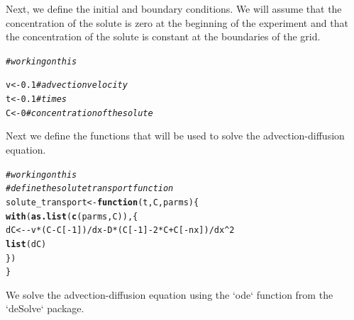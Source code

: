 \documentclass{tufte-handout}\usepackage[]{graphicx}\usepackage[]{xcolor}
\makeatletter
\newcommand{\hlnum}[1]{\textcolor[rgb]{0.686,0.059,0.569}{#1}}%
\newcommand{\hlcom}[1]{\textcolor[rgb]{0.678,0.584,0.686}{\textit{#1}}}%
\newcommand{\hlopt}[1]{\textcolor[rgb]{0,0,0}{#1}}%
\newcommand{\hlstd}[1]{\textcolor[rgb]{0.345,0.345,0.345}{#1}}%
\newcommand{\hlkwa}[1]{\textcolor[rgb]{0.161,0.373,0.58}{\textbf{#1}}}%
\newcommand{\hlkwb}[1]{\textcolor[rgb]{0.69,0.353,0.396}{#1}}%
\newcommand{\hlkwc}[1]{\textcolor[rgb]{0.333,0.667,0.333}{#1}}%
\newcommand{\hlkwd}[1]{\textcolor[rgb]{0.737,0.353,0.396}{\textbf{#1}}}%
\newenvironment{kframe}{%
 \def\at@end@of@kframe{}%
 \ifinner\ifhmode%
  \def\at@end@of@kframe{\end{minipage}}%
  \begin{minipage}{\columnwidth}%
 \fi\fi%
 \def\FrameCommand##1{\hskip\@totalleftmargin \hskip-\fboxsep
 \colorbox{shadecolor}{##1}\hskip-\fboxsep
     \hskip-\linewidth \hskip-\@totalleftmargin \hskip\columnwidth}%
 \MakeFramed {\advance\hsize-\width
   \@totalleftmargin\z@ \linewidth\hsize
   \@setminipage}}%
 {\par\unskip\endMakeFramed%
 \at@end@of@kframe}
\newenvironment{knitrout}{}{} %
\makeatother
\begin{document}
Next, we define the initial and boundary conditions. We will assume that the concentration of the solute is zero at the beginning of the experiment and that the concentration of the solute is constant at the boundaries of the grid.

\begin{knitrout}
\color{fgcolor}\begin{kframe}
\begin{alltt}
\hlcom{# working on this}

\hlstd{v} \hlkwb{<-} \hlnum{0.1} \hlcom{# advection velocity}
\hlstd{t} \hlkwb{<-} \hlnum{0.1} \hlcom{# times}
\hlstd{C} \hlkwb{<-} \hlnum{0} \hlcom{# concentration of the solute}
\end{alltt}
\end{kframe}
\end{knitrout}

Next we define the functions that will be used to solve the advection-diffusion equation.

\begin{knitrout}
\color{fgcolor}\begin{kframe}
\begin{alltt}
\hlcom{# working on this}
\hlcom{# define the solute transport function}
\hlstd{solute_transport} \hlkwb{<-} \hlkwa{function}\hlstd{(}\hlkwc{t}\hlstd{,} \hlkwc{C}\hlstd{,} \hlkwc{parms}\hlstd{) \{}
  \hlkwd{with}\hlstd{(}\hlkwd{as.list}\hlstd{(}\hlkwd{c}\hlstd{(parms, C)), \{}
    \hlstd{dC} \hlkwb{<-} \hlopt{-}\hlstd{v} \hlopt{*} \hlstd{(C} \hlopt{-} \hlstd{C[}\hlopt{-}\hlnum{1}\hlstd{])}\hlopt{/}\hlstd{dx} \hlopt{-} \hlstd{D} \hlopt{*} \hlstd{(C[}\hlopt{-}\hlnum{1}\hlstd{]} \hlopt{-} \hlnum{2} \hlopt{*} \hlstd{C} \hlopt{+} \hlstd{C[}\hlopt{-}\hlstd{nx])}\hlopt{/}\hlstd{dx}\hlopt{^}\hlnum{2}
    \hlkwd{list}\hlstd{(dC)}
  \hlstd{\})}
\hlstd{\}}
\end{alltt}
\end{kframe}
\end{knitrout}

We solve the advection-diffusion equation using the `ode` function from the `deSolve` package.
\end{document}
